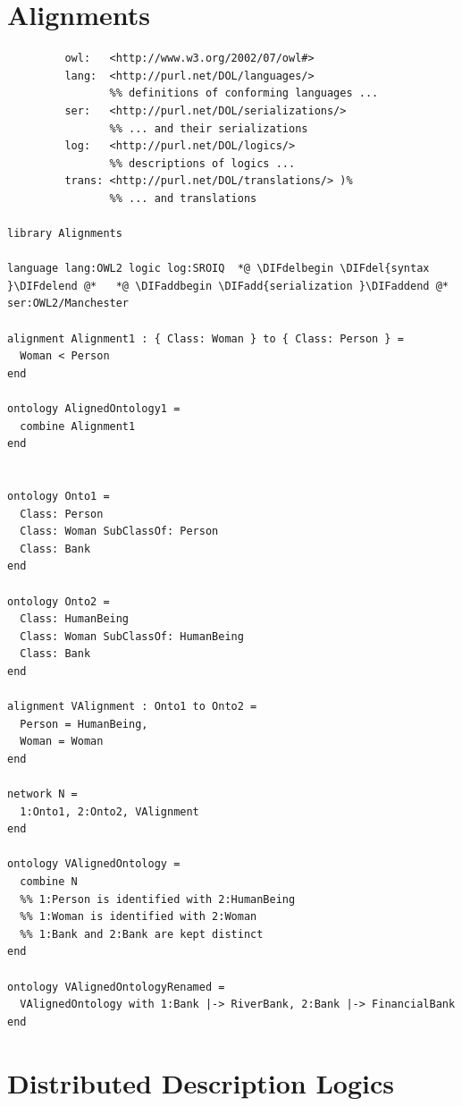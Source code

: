 \documentclass[10pt,fleqn,final]{scrreprt}
\newcommand{\sclause}[1]{\section{#1}}
\newcommand{\ssclause}[1]{\subsection{#1}}
\providecommand{\DIFadd}[1]{{\protect\color{blue}\uwave{#1}}} %
\providecommand{\DIFdel}[1]{{\protect\color{red}\sout{#1}}}                      %
\providecommand{\DIFaddbegin}{} %
\providecommand{\DIFaddend}{} %
\providecommand{\DIFdelbegin}{} %
\providecommand{\DIFdelend}{} %
\begin{document}
\DIFdelbegin %
\DIFdelend \DIFaddbegin \sclause{Alignments}\label{ex:alignment}
\DIFaddend {}

\begin{lstlisting}[basicstyle=\ttfamily,language=dolText,alsolanguage=OWL2manchester,escapechar=@,mathescape]
%DIF > prefix( :      <http://www.example.org/@alignment@#>
         owl:   <http://www.w3.org/2002/07/owl#>
         lang:  <http://purl.net/DOL/languages/>
                %% definitions of conforming languages ...
         ser:   <http://purl.net/DOL/serializations/>
                %% ... and their serializations
         log:   <http://purl.net/DOL/logics/>
                %% descriptions of logics ...
         trans: <http://purl.net/DOL/translations/> )%
                %% ... and translations

library Alignments

language lang:OWL2 logic log:SROIQ  *@ \DIFdelbegin \DIFdel{syntax }\DIFdelend @*   *@ \DIFaddbegin \DIFadd{serialization }\DIFaddend @*  ser:OWL2/Manchester

alignment Alignment1 : { Class: Woman } to { Class: Person } =
  Woman < Person
end

ontology AlignedOntology1 =
  combine Alignment1
end


ontology Onto1 =
  Class: Person
  Class: Woman SubClassOf: Person
  Class: Bank
end

ontology Onto2 =
  Class: HumanBeing
  Class: Woman SubClassOf: HumanBeing
  Class: Bank
end

alignment VAlignment : Onto1 to Onto2 =
  Person = HumanBeing,
  Woman = Woman
end

network N =
  1:Onto1, 2:Onto2, VAlignment
end

ontology VAlignedOntology =
  combine N
  %% 1:Person is identified with 2:HumanBeing
  %% 1:Woman is identified with 2:Woman
  %% 1:Bank and 2:Bank are kept distinct
end

ontology VAlignedOntologyRenamed =
  VAlignedOntology with 1:Bank |-> RiverBank, 2:Bank |-> FinancialBank
end

\end{lstlisting}


\sclause{Distributed Description Logics}\DIFaddbegin \label{ex:DDL}
\DIFaddend 
\end{document}

